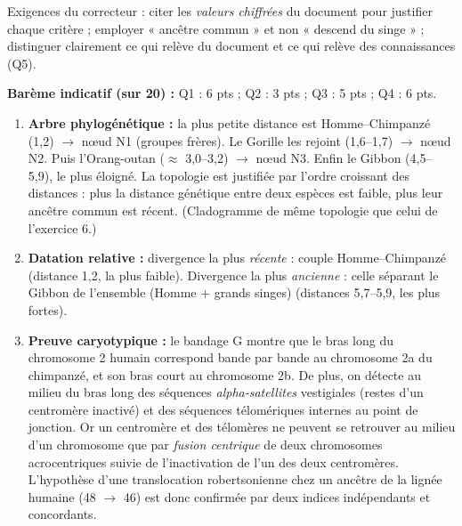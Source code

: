 \documentclass[11pt]{article}
\begin{document}
\begin{attention}
Exigences du correcteur : citer les \emph{valeurs chiffrées} du document pour justifier chaque critère ; employer « ancêtre commun » et non « descend du singe » ; distinguer clairement ce qui relève du document et ce qui relève des connaissances (Q5).
\end{attention}

\begin{corrige}
\textbf{Barème indicatif (sur 20) :} Q1 : 6 pts ; Q2 : 3 pts ; Q3 : 5 pts ; Q4 : 6 pts.
\begin{enumerate}
    \item \textbf{Arbre phylogénétique :} la plus petite distance est Homme--Chimpanzé (1,2) $\rightarrow$ nœud N1 (groupes frères). Le Gorille les rejoint (1,6--1,7) $\rightarrow$ nœud N2. Puis l'Orang-outan ($\approx$ 3,0--3,2) $\rightarrow$ nœud N3. Enfin le Gibbon (4,5--5,9), le plus éloigné. La topologie est justifiée par l'ordre croissant des distances : plus la distance génétique entre deux espèces est faible, plus leur ancêtre commun est récent. (Cladogramme de même topologie que celui de l'exercice 6.)
    \item \textbf{Datation relative :} divergence la plus \emph{récente} : couple Homme--Chimpanzé (distance 1,2, la plus faible). Divergence la plus \emph{ancienne} : celle séparant le Gibbon de l'ensemble (Homme + grands singes) (distances 5,7--5,9, les plus fortes).
    \item \textbf{Preuve caryotypique :} le bandage G montre que le bras long du chromosome 2 humain correspond bande par bande au chromosome 2a du chimpanzé, et son bras court au chromosome 2b. De plus, on détecte au milieu du bras long des séquences \emph{alpha-satellites} vestigiales (restes d'un centromère inactivé) et des séquences télomériques internes au point de jonction. Or un centromère et des télomères ne peuvent se retrouver au milieu d'un chromosome que par \emph{fusion centrique} de deux chromosomes acrocentriques suivie de l'inactivation de l'un des deux centromères. L'hypothèse d'une translocation robertsonienne chez un ancêtre de la lignée humaine (48 $\rightarrow$ 46) est donc confirmée par deux indices indépendants et concordants.

\end{enumerate}
\end{corrige}
\end{document}
